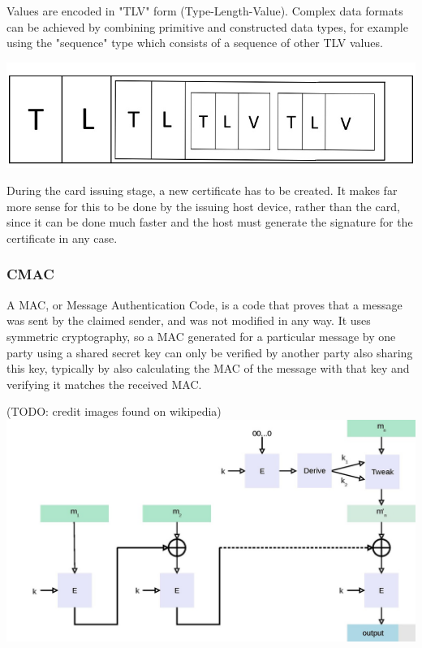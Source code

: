 \documentclass[12pt]{article}
\begin{document}
Values are encoded in "TLV" form (Type-Length-Value). Complex data formats can be achieved by combining primitive and constructed data types, for example using the "sequence" type which consists of a sequence of other TLV values.

\includegraphics[scale=0.5]{implementation/tlv}

During the card issuing stage, a new certificate has to be created. It makes far more sense for this to be done by the issuing host device, rather than the card, since it can be done much faster and the host must generate the signature for the certificate in any case.

\subsubsection{CMAC}
\label{subsec:cmac}

A MAC, or Message Authentication Code, is a code that proves that a message was sent by the claimed sender, and was not modified in any way. It uses symmetric cryptography, so a MAC generated for a particular message by one party using a shared secret key can only be verified by another party also sharing this key, typically by also calculating the MAC of the message with that key and verifying it matches the received MAC.


(TODO: credit images found on wikipedia)\\
\includegraphics[scale=0.5]{implementation/CMAC}
\end{document}
